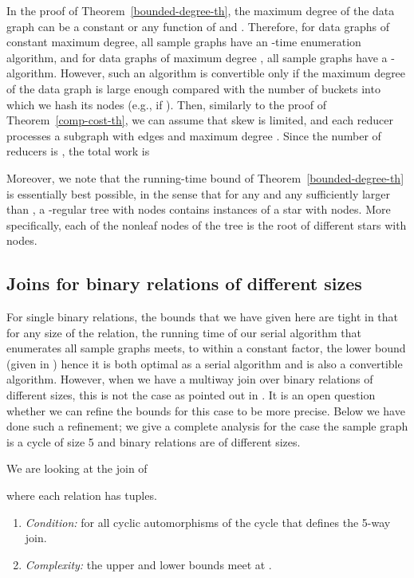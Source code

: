 In the proof of Theorem~\ref{bounded-degree-th}, the maximum degree  of the data graph can be a constant or any function of  and . Therefore, for data graphs of constant maximum degree, all sample graphs have an -time enumeration algorithm, and for data graphs of maximum degree , all sample graphs have a -algorithm. However, such an algorithm is convertible only if the maximum degree  of the data graph is large enough compared with the number  of buckets into which we hash its nodes (e.g., if ). Then, similarly to the proof of Theorem~\ref{comp-cost-th}, we can assume that skew is limited, and each reducer processes a subgraph with  edges and maximum degree . Since the number of reducers is , the total work is


Moreover, we note that the running-time bound of Theorem~\ref{bounded-degree-th} is essentially best possible, in the sense that for any  and any  sufficiently larger than , a -regular tree with  nodes contains  instances of a star with  nodes. More specifically, each of the  nonleaf nodes of the tree is the root of  different stars with  nodes.

\subsection{Joins for binary relations of different sizes}

For single binary relations, the bounds that we have given here are tight in that for any size of the relation,
the running time of our serial algorithm that enumerates all sample
graphs meets, to within a constant factor, the lower bound (given in \cite{Alon81}) hence it is
both optimal as a serial algorithm and is also a convertible algorithm. However, when we have a multiway
join over binary relations of different sizes, this is not the case as pointed out in \cite{NgoPRR12}. It is an open
question whether we can refine the bounds for this case to be more precise. Below we have done such a refinement; we give a complete
analysis for the case the sample graph is a cycle of size 5 and binary relations are of different sizes.

We are looking at the join of

where each relation  has  tuples.


\begin{enumerate}
 \item {\sl Condition:}   for all cyclic automorphisms of the cycle that defines the 5-way join.

\item {\sl Complexity:}  the upper and lower bounds meet at .
\end{enumerate}

